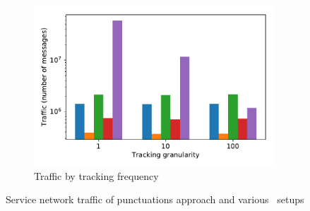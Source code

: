 \begin{figure}[t!]
\begin{subfigure}[b]{0.3\textwidth}
            \includegraphics[width=0.99\textwidth]{pics/traffic_by_tracking_frequency_bars.pdf}
            \caption{Traffic by tracking frequency}
            \label{traffic_granularity}
    \end{subfigure}
    \caption{Service network traffic of punctuations approach and various \tracker\ setups}
    \label{traffic_plots}
\end{figure}


